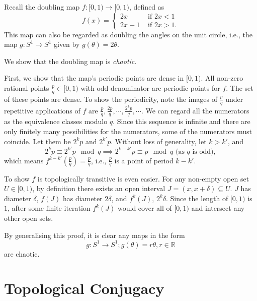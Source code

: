\begin{example}\label{ex_doubling_map}
	Recall the doubling map $f: [0,1) \rightarrow [0,1)$, defined as
	\begin{equation}\label{eq:doubling_map}
	f(x) = 
		\begin{cases}
			2x &\text{ if } 2x < 1 \\
			2x -1 &\text{ if } 2x > 1.
		\end{cases}
	\end{equation}
	This map can also be regarded as doubling the angles on the unit circle, i.e., the map $g: S^1 \rightarrow S^1$ given by $ g(\theta) = 2 \theta$.
	
	We show that the doubling map is \textit{chaotic}.

	First, we show that the map's periodic points are dense in $[0,1)$. All non-zero rational points $\frac{p}{q} \in [0,1)$ with odd denominator are periodic points for $f$. 
	The set of these points are dense.
	To show the periodicity, note the images of $\frac{p}{q}$ under repetitive applications of $f$ are $\frac{p}{q}, \frac{2p}{q}, \cdots, \frac{2^k p}{q}, \cdots$.
	We can regard all the numerators as the equivalence classes modulo $q$.
	Since this sequence is infinite and there are only finitely many possibilities for the numerators, some of the numerators must coincide. Let them be $2^k p$ and $2^{k'} p$. 
	Without loss of generality, let $k > k'$, and
	$$
	2^k p \equiv 2^{k'} p \mod q \implies 
	2^{k-k'} p \equiv p \mod q \text{ (as $q$ is odd)},
	$$
	which means $f^{k-k'}(\frac{p}{q}) = \frac{p}{q}$, i.e., $\frac{p}{q}$ is a point of period $k - k'$.

	To show $f$ is topologically transitive is even easier. 
	For any non-empty open set $U \in [0,1)$, by definition there exists an open interval $J = (x, x+ \delta) \subseteq U$. 
	$J$ has diameter $\delta$, $f(J)$ has diameter $2 \delta$, and $f^k(J)$, $2^k \delta$. 
	Since the length of $[0,1)$ is $1$, after some finite iteration $f^k(J)$ would cover all of $[0,1)$ and intersect any other open sets.

	By generalising this proof, it is clear any maps in the form 
	$$
	g: S^1 \rightarrow S^1; g(\theta) = r \theta, r \in \mathbb{R}
	$$
	are chaotic.
\end{example}

\section{Topological Conjugacy}

